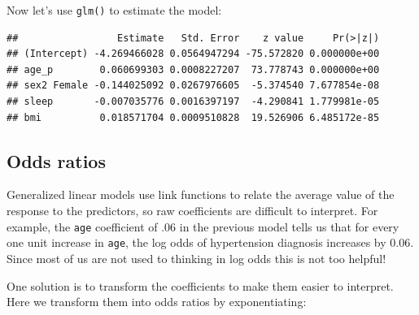 \documentclass[]{book}
\newenvironment{Shaded}{\begin{snugshade}}{\end{snugshade}}
\newcommand{\CommentTok}[1]{\textcolor[rgb]{0.56,0.35,0.01}{\textit{#1}}}
\newcommand{\DataTypeTok}[1]{\textcolor[rgb]{0.13,0.29,0.53}{#1}}
\newcommand{\DecValTok}[1]{\textcolor[rgb]{0.00,0.00,0.81}{#1}}
\newcommand{\KeywordTok}[1]{\textcolor[rgb]{0.13,0.29,0.53}{\textbf{#1}}}
\newcommand{\NormalTok}[1]{#1}
\newcommand{\OperatorTok}[1]{\textcolor[rgb]{0.81,0.36,0.00}{\textbf{#1}}}
\newcommand{\StringTok}[1]{\textcolor[rgb]{0.31,0.60,0.02}{#1}}
\begin{document}
Now let's use \texttt{glm()} to estimate the model:

\begin{Shaded}
\end{Shaded}

\begin{verbatim}
##                 Estimate   Std. Error    z value     Pr(>|z|)
## (Intercept) -4.269466028 0.0564947294 -75.572820 0.000000e+00
## age_p        0.060699303 0.0008227207  73.778743 0.000000e+00
## sex2 Female -0.144025092 0.0267976605  -5.374540 7.677854e-08
## sleep       -0.007035776 0.0016397197  -4.290841 1.779981e-05
## bmi          0.018571704 0.0009510828  19.526906 6.485172e-85
\end{verbatim}

\hypertarget{odds-ratios}{%
\subsection{Odds ratios}\label{odds-ratios}}

Generalized linear models use link functions to relate the average value of the response to the predictors,
so raw coefficients are difficult to interpret. For example, the \texttt{age} coefficient of .06 in the previous
model tells us that for every one unit increase in \texttt{age}, the log odds of hypertension diagnosis increases
by 0.06. Since most of us are not used to thinking in log odds this is not too helpful!

One solution is to transform the coefficients to make them easier to interpret.
Here we transform them into odds ratios by exponentiating:

\begin{Shaded}
\end{Shaded}
\end{document}

